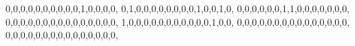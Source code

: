\documentclass[
  letterpaper,
  DIV=11,
  numbers=noendperiod]{scrreprt}
\newenvironment{Shaded}{\begin{snugshade}}{\end{snugshade}}
\newcommand{\DecValTok}[1]{\textcolor[rgb]{0.68,0.00,0.00}{#1}}
\newcommand{\NormalTok}[1]{\textcolor[rgb]{0.00,0.23,0.31}{#1}}
\begin{document}
\begin{Shaded}
\begin{Highlighting}[]
               \DecValTok{0}\NormalTok{,}\DecValTok{0}\NormalTok{,}\DecValTok{0}\NormalTok{,}\DecValTok{0}\NormalTok{,}\DecValTok{0}\NormalTok{,}\DecValTok{0}\NormalTok{,}\DecValTok{0}\NormalTok{,}\DecValTok{0}\NormalTok{,}\DecValTok{0}\NormalTok{,}\DecValTok{0}\NormalTok{,}\DecValTok{1}\NormalTok{,}\DecValTok{0}\NormalTok{,}\DecValTok{0}\NormalTok{,}\DecValTok{0}\NormalTok{,}\DecValTok{0}\NormalTok{,}
               \DecValTok{0}\NormalTok{,}\DecValTok{1}\NormalTok{,}\DecValTok{0}\NormalTok{,}\DecValTok{0}\NormalTok{,}\DecValTok{0}\NormalTok{,}\DecValTok{0}\NormalTok{,}\DecValTok{0}\NormalTok{,}\DecValTok{0}\NormalTok{,}\DecValTok{0}\NormalTok{,}\DecValTok{0}\NormalTok{,}\DecValTok{1}\NormalTok{,}\DecValTok{0}\NormalTok{,}\DecValTok{0}\NormalTok{,}\DecValTok{1}\NormalTok{,}\DecValTok{0}\NormalTok{,}
               \DecValTok{0}\NormalTok{,}\DecValTok{0}\NormalTok{,}\DecValTok{0}\NormalTok{,}\DecValTok{0}\NormalTok{,}\DecValTok{0}\NormalTok{,}\DecValTok{0}\NormalTok{,}\DecValTok{1}\NormalTok{,}\DecValTok{1}\NormalTok{,}\DecValTok{0}\NormalTok{,}\DecValTok{0}\NormalTok{,}\DecValTok{0}\NormalTok{,}\DecValTok{0}\NormalTok{,}\DecValTok{0}\NormalTok{,}\DecValTok{0}\NormalTok{,}\DecValTok{0}\NormalTok{,}
               \DecValTok{0}\NormalTok{,}\DecValTok{0}\NormalTok{,}\DecValTok{0}\NormalTok{,}\DecValTok{0}\NormalTok{,}\DecValTok{0}\NormalTok{,}\DecValTok{0}\NormalTok{,}\DecValTok{0}\NormalTok{,}\DecValTok{0}\NormalTok{,}\DecValTok{0}\NormalTok{,}\DecValTok{0}\NormalTok{,}\DecValTok{0}\NormalTok{,}\DecValTok{0}\NormalTok{,}\DecValTok{0}\NormalTok{,}\DecValTok{0}\NormalTok{,}\DecValTok{0}\NormalTok{,}
               \DecValTok{1}\NormalTok{,}\DecValTok{0}\NormalTok{,}\DecValTok{0}\NormalTok{,}\DecValTok{0}\NormalTok{,}\DecValTok{0}\NormalTok{,}\DecValTok{0}\NormalTok{,}\DecValTok{0}\NormalTok{,}\DecValTok{0}\NormalTok{,}\DecValTok{0}\NormalTok{,}\DecValTok{0}\NormalTok{,}\DecValTok{0}\NormalTok{,}\DecValTok{0}\NormalTok{,}\DecValTok{1}\NormalTok{,}\DecValTok{0}\NormalTok{,}\DecValTok{0}\NormalTok{,}
               \DecValTok{0}\NormalTok{,}\DecValTok{0}\NormalTok{,}\DecValTok{0}\NormalTok{,}\DecValTok{0}\NormalTok{,}\DecValTok{0}\NormalTok{,}\DecValTok{0}\NormalTok{,}\DecValTok{0}\NormalTok{,}\DecValTok{0}\NormalTok{,}\DecValTok{0}\NormalTok{,}\DecValTok{0}\NormalTok{,}\DecValTok{0}\NormalTok{,}\DecValTok{0}\NormalTok{,}\DecValTok{0}\NormalTok{,}\DecValTok{0}\NormalTok{,}\DecValTok{0}\NormalTok{,}
               \DecValTok{0}\NormalTok{,}\DecValTok{0}\NormalTok{,}\DecValTok{0}\NormalTok{,}\DecValTok{0}\NormalTok{,}\DecValTok{0}\NormalTok{,}\DecValTok{0}\NormalTok{,}\DecValTok{0}\NormalTok{,}\DecValTok{0}\NormalTok{,}\DecValTok{0}\NormalTok{,}\DecValTok{0}\NormalTok{,}\DecValTok{0}\NormalTok{,}\DecValTok{0}\NormalTok{,}\DecValTok{0}\NormalTok{,}\DecValTok{0}\NormalTok{,}\DecValTok{0}\NormalTok{,}

\end{Highlighting}
\end{Shaded}
\end{document}

